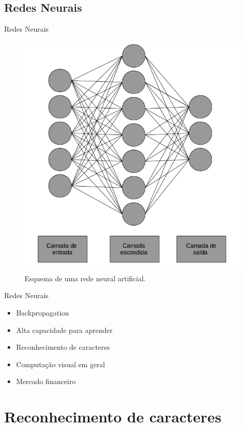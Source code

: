 \documentclass{beamer}
\begin{document}
    \subsection{Redes Neurais}
        \begin{frame}{Redes Neurais}
            \begin{figure}[ht]
            \centering
            \includegraphics[width=.7\textwidth,height=.7\textheight]{redeneural.png}
            \caption{Esquema de uma rede neural artificial.}
            \label{fig:ann}
            \end{figure}
        \end{frame}

        \begin{frame}{Redes Neurais}
            \begin{itemize}
                \item Backpropagation
                \item Alta capacidade para aprender
                \item Reconhecimento de caracteres
                \item Computação visual em geral
                \item Mercado financeiro
            \end{itemize}
        \end{frame}
\section{Reconhecimento de caracteres}
\end{document}
